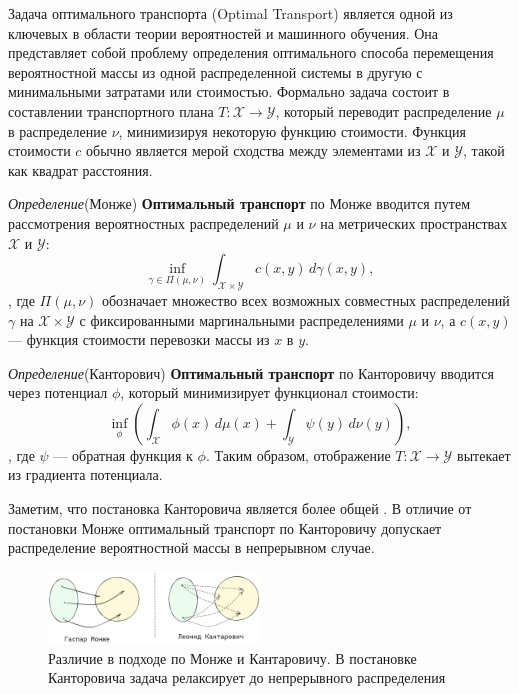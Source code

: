 Задача оптимального транспорта (Optimal Transport)\cite{villani2009optimal} является одной из ключевых  
в области теории вероятностей и машинного обучения.
Она представляет собой проблему определения оптимального способа перемещения вероятностной массы из одной 
распределенной системы в другую с минимальными затратами или стоимостью. Формально задача состоит в составлении 
транспортного плана \( T: \mathcal{X} \rightarrow \mathcal{Y} \), 
который переводит распределение \( \mu \) в распределение \( \nu \), минимизируя некоторую функцию стоимости. 
Функция стоимости $c$ обычно является мерой сходства между элементами из \( \mathcal{X} \) и \( \mathcal{Y} \), 
такой как квадрат расстояния. 

\textit{Определение}(Монже) \textbf{Оптимальный транспорт} по Монже вводится путем рассмотрения вероятностных 
распределений \( \mu \) и \( \nu \) на метрических пространствах \( \mathcal{X} \) и \( \mathcal{Y} \):
\begin{equation}
    \inf_{\gamma \in \Pi(\mu, \nu)} \int_{\mathcal{X} \times \mathcal{Y}} c(x,y) \, d\gamma(x,y),
\end{equation}
, где \( \Pi(\mu, \nu) \) обозначает множество всех возможных совместных распределений 
\( \gamma \) на \( \mathcal{X} \times \mathcal{Y} \) с фиксированными маргинальными
распределениями \( \mu \) и \( \nu \), а \( c(x,y) \) — функция стоимости перевозки массы из \( x \) в \( y \).

\textit{Определение}(Канторович) \textbf{Оптимальный транспорт} по Канторовичу  вводится через потенциал $\phi$, 
который минимизирует функционал стоимости:
\begin{equation}
    \inf_{\phi} \left( \int_{\mathcal{X}} \phi(x) \, d\mu(x) + \int_{\mathcal{Y}} \psi(y) \, d\nu(y) \right),
\end{equation}
, где \( \psi \) — обратная функция к \( \phi \). Таким образом, 
отображение \( T: \mathcal{X} \rightarrow \mathcal{Y} \) вытекает из градиента потенциала.

Заметим, что постановка Канторовича является более общей \cite{monge_vs_kantarovich}. В отличие от постановки Монже 
оптимальный транспорт по Канторовичу допускает распределение вероятностной массы в непрерывном случае.

\begin{figure}[h]
    \centering
    \includegraphics[width=0.5\textwidth]{assets/math/transport/optimal_transport.excalidraw.png}
    \caption{Различие в подходе по Монже и Кантаровичу. В постановке Канторовича задача релаксирует до 
    непрерывного распределения}
    \label{monge_vs_kantarovich}
\end{figure}

